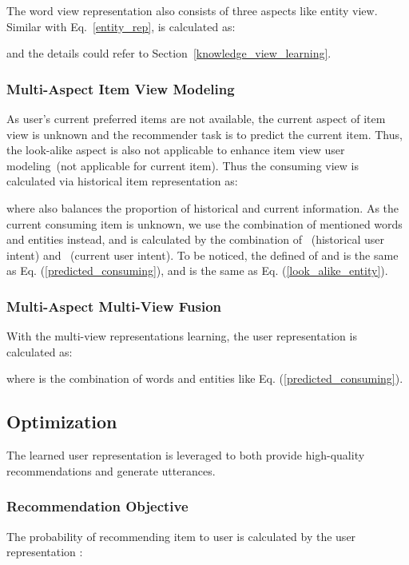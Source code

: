\documentclass[sigconf,natbib=true]{acmart}
\begin{document}
The word view representation also consists of three aspects like entity view.
Similar with Eq.~\ref{entity_rep},  is calculated as:

and the details could refer to Section~\ref{knowledge_view_learning}.

\subsubsection{Multi-Aspect Item View Modeling}

As user's current preferred items are not available, the current aspect of item view is unknown and the recommender task is to predict the current item. Thus, the look-alike aspect is also not applicable to enhance item view user modeling~(not applicable for current item). Thus the consuming view is calculated via historical item representation  as:

where  also balances the proportion of historical and current information. As the current consuming item is unknown, we use the combination of mentioned words and entities instead, and  is calculated by the combination of ~(historical user intent) and ~(current user intent). To be noticed, the defined of  and  is the same as Eq. (\ref{predicted_consuming}),  and  is the same as Eq. (\ref{look_alike_entity}).




\subsubsection{Multi-Aspect Multi-View Fusion}

With the multi-view representations learning, the user representation is calculated as:

where  is the combination of words and entities like Eq. (\ref{predicted_consuming}).




\subsection{Optimization}

The learned user representation  is leveraged to both provide high-quality recommendations and generate utterances.

\subsubsection{Recommendation Objective}

The probability of recommending item  to user  is calculated by the user representation :
\end{document}
